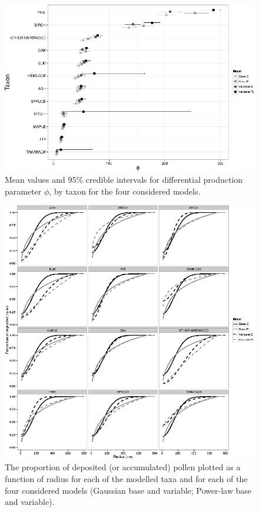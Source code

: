 \begin{figure}
\centering
\includegraphics[width=7in]{figures/phi.png}
\caption{Mean values and 95\% credible intervals for differential
  production parameter $\phi$, by taxon for the four considered
  models.}
\label{fig:phi}
\end{figure}

\begin{figure}
\centering
\includegraphics[width=7in]{figures/kernel_discrete_cdfs.png}
\caption{The proportion of deposited (or accumulated) pollen plotted
  as a function of radius for each of the modelled taxa and for each
  of the four considered models (Gaussian base and variable; Power-law
  base and variable).}
\label{fig:cdf}
\end{figure}

